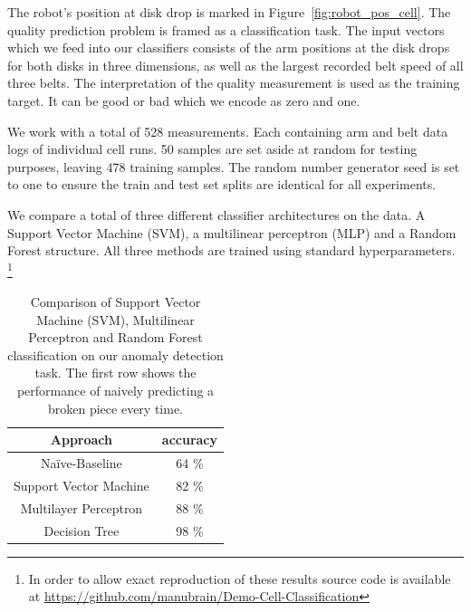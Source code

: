 \documentclass[5p,times,procedia]{elsarticle}
\begin{document}
The robot's position at disk drop is marked in 
Figure~\ref{fig:robot_pos_cell}. The quality prediction problem is 
framed as a classification task. The input vectors which we feed into our
classifiers consists of the arm positions at the disk drops for both
disks in three dimensions, as well as the largest recorded belt speed
of all three belts. The interpretation of the quality measurement is 
used as the training target. It can be good or bad which we encode as 
zero and one.

We work with a total of 528 measurements. Each containing arm and belt data
logs of individual cell runs. 50 samples are set aside at random for testing 
purposes, leaving 478 training samples. The random number generator seed is
set to one to ensure the train and test set splits are identical 
for all experiments.

We compare a total of three different classifier architectures on the data.
A Support Vector Machine (SVM), a multilinear perceptron (MLP) and a Random Forest
structure. All three methods are trained using standard hyperparameters.
\footnote{In order to allow exact reproduction of these results source
code is available at \url{https://github.com/manubrain/Demo-Cell-Classification}}

\begin{table}
       \centering
       \begin{tabular}{ c c } \toprule
              Approach         & accuracy \\ \midrule
              Na\"ive-Baseline & 64 \% \\
              Support Vector Machine & 82 \% \\
              Multilayer Perceptron & 88 \% \\
              Decision Tree         & 98 \% \\ \bottomrule
       \end{tabular}
       \caption{Comparison of Support Vector Machine (SVM), Multilinear Perceptron and 
                Random Forest classification on our anomaly detection task. 
                The first row shows the performance of naively predicting a broken piece
                every time.}
       \label{tab:class_comp}
\end{table}
\end{document}

